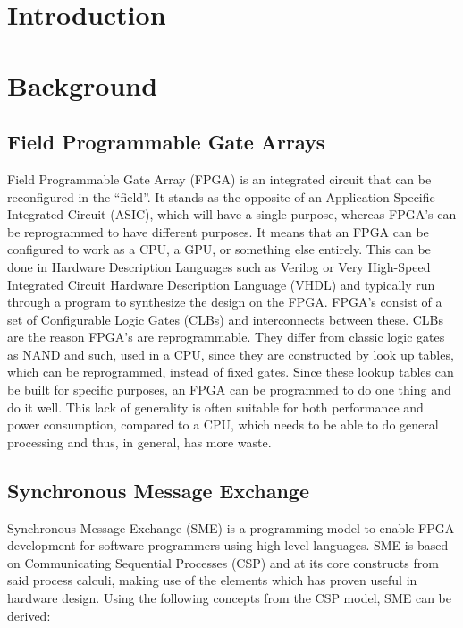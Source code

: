 \documentclass[a4paper, openany]{book}
\date{}
\title{}
\begin{document}
\maketitle
\tableofcontents
\chapter{Introduction}
\label{sec:org13bf0e9}

\chapter{Background}
\label{sec:org433e8f8}

\section{Field Programmable Gate Arrays}
\label{sec:org575d676}
Field Programmable Gate Array (FPGA) is an integrated circuit that can be reconfigured in the ``field''. It stands as the opposite of an Application Specific Integrated Circuit (ASIC), which will have a single purpose, whereas FPGA's can be reprogrammed to have different purposes. It means that an FPGA can be configured to work as a CPU, a GPU, or something else entirely. This can be done in Hardware Description Languages such as Verilog or Very High-Speed Integrated Circuit Hardware Description Language (VHDL) and typically run through a program to synthesize the design on the FPGA.
FPGA's consist of a set of Configurable Logic Gates (CLBs) and interconnects between these. CLBs are the reason FPGA's are reprogrammable. They differ from classic logic gates as NAND and such, used in a CPU, since they are constructed by look up tables, which can be reprogrammed, instead of fixed gates. Since these lookup tables can be built for specific purposes, an FPGA can be programmed to do one thing and do it well. This lack of generality is often suitable for both performance and power consumption, compared to a CPU, which needs to be able to do general processing and thus, in general, has more waste.

\section{Synchronous Message Exchange}
\label{sec:SME}
Synchronous Message Exchange (SME) is a programming model to enable FPGA development for software programmers using high-level languages. SME is based on Communicating Sequential Processes (CSP) and at its core constructs from said process calculi, making use of the elements which has proven useful in hardware design\cite{sme}. Using the following concepts from the CSP model\cite{CSP}, SME can be derived:
\end{document}
